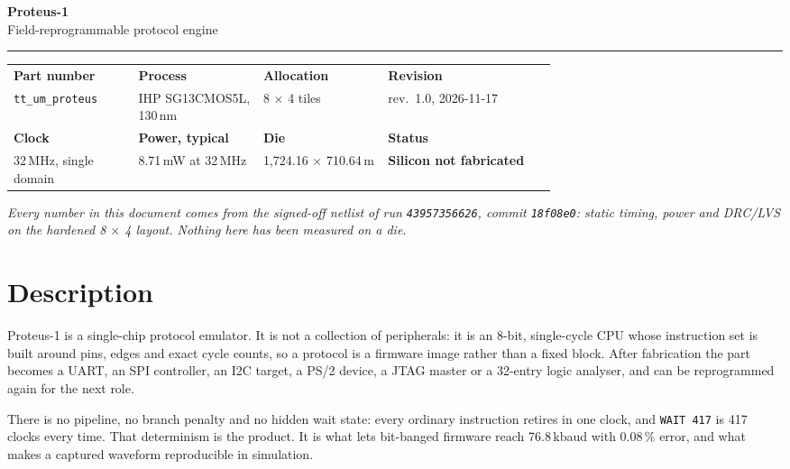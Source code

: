 \documentclass[10pt,a4paper]{article}
\newcommand{\um}{\textmu m}
\begin{document}
\begin{center}
  {\color{proteus}\Huge\bfseries Proteus-1}\\[2pt]
  {\large Field-reprogrammable protocol engine}\\[2pt]
  {\color{rule}\rule{0.55\linewidth}{0.8pt}}
\end{center}

\begin{center}
\begin{tabularx}{\linewidth}{@{}L{0.235\linewidth}L{0.235\linewidth}L{0.235\linewidth}X@{}}
\toprule
\textbf{Part number} & \textbf{Process} & \textbf{Allocation} & \textbf{Revision}\\
\texttt{tt\_um\_proteus} & IHP SG13CMOS5L, 130\,nm & 8 \(\times\) 4 tiles & rev.\ 1.0, 2026-11-17\\
\midrule
\textbf{Clock} & \textbf{Power, typical} & \textbf{Die} & \textbf{Status}\\
32\,MHz, single domain & 8.71\,mW at 32\,MHz & 1,724.16 \(\times\) 710.64\,\um & \textbf{Silicon not fabricated}\\
\bottomrule
\end{tabularx}
\end{center}

\vspace{2pt}
{\footnotesize\itshape Every number in this document comes from the signed-off
netlist of run \texttt{43957356626}, commit \texttt{18f08e0}: static timing,
power and DRC/LVS on the hardened 8 \(\times\) 4 layout. Nothing here has been
measured on a die.}

\section{Description}

Proteus-1 is a single-chip protocol emulator. It is not a collection of
peripherals: it is an 8-bit, single-cycle CPU whose instruction set is built
around pins, edges and exact cycle counts, so a protocol is a firmware image
rather than a fixed block. After fabrication the part becomes a UART, an SPI
controller, an I2C target, a PS/2 device, a JTAG master or a 32-entry logic
analyser, and can be reprogrammed again for the next role.

There is no pipeline, no branch penalty and no hidden wait state: every ordinary
instruction retires in one clock, and \texttt{WAIT 417} is 417 clocks every time.
That determinism is the product. It is what lets bit-banged firmware reach
76.8\,kbaud with 0.08\,\% error, and what makes a captured waveform reproducible
in simulation.
\end{document}

